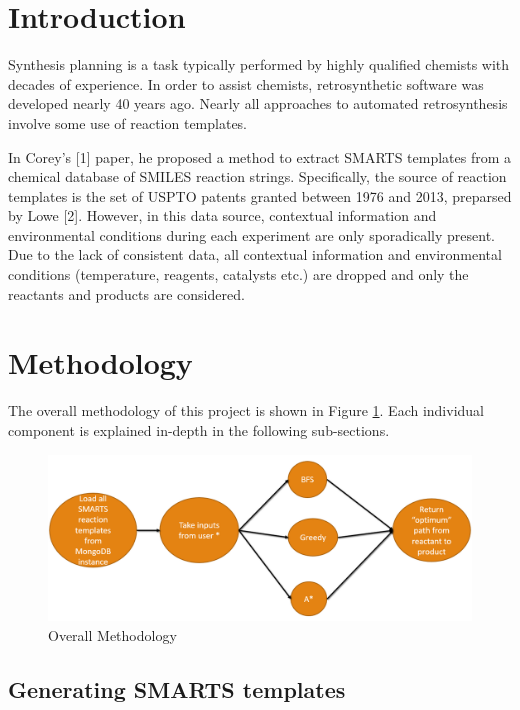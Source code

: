 \documentclass[preprint,12pt]{elsarticle}
\begin{document}

\section{Introduction}
\label{S:1}

Synthesis planning is a task typically performed by highly qualified chemists with decades of experience. In order to assist chemists, retrosynthetic software was developed nearly 40 years ago. Nearly all approaches to automated retrosynthesis involve some use of reaction templates.

In Corey's [1] paper, he proposed a method to extract SMARTS templates from a chemical database of SMILES reaction strings. Specifically, the source of reaction templates is the set of USPTO patents granted between 1976 and 2013, preparsed by Lowe [2]. However, in this data source, contextual information and environmental conditions during each experiment are only sporadically present. Due to the lack of consistent data, all contextual information and environmental conditions (temperature, reagents, catalysts etc.) are dropped and only the reactants and products are considered.  

\section{Methodology}
The overall methodology of this project is shown in Figure \ref{fig:overall_method}. Each individual component is explained in-depth in the following sub-sections.

\begin{figure}[h]
\centering\includegraphics[width=1\linewidth]{methodology.PNG}
\caption{Overall Methodology}
\label{fig:overall_method}
\end{figure}

\subsection{Generating SMARTS templates}
\end{document}
